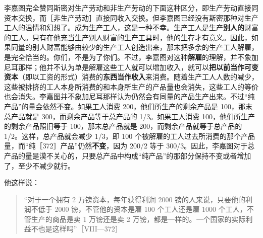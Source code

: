 李嘉图完全赞同斯密对生产劳动和非生产劳动的下面这种区分，即生产劳动直接同资本交换，而［非生产劳动］直接同收入交换。但李嘉图已经没有斯密那种对生产工人的温情和幻想了。成为生产工人，这是一种不幸。生产工人是生产\textbf{别人的}财富的工人。只有在他充当生产别人财富的生产工具时，他的生存才有意义。因此，如果同量的别人财富能够由较少的生产工人创造出来，那末把多余的生产工人解雇，是完全恰当的。你们，不是为了你们。不过，李嘉图对这种\textbf{解雇}的理解，并不象加尼耳那样；他并不认为单是解雇这些工人就可以增加收入，就可以\textbf{把以前当作可变资本}（即以工资的形式）消费的\textbf{东西当作收入}来消费。随着生产工人人数的减少，这些被排挤的工人本身所消费的和本身所生产的产品量也会消失，这些工人的等价也会消失。李嘉图并不象加尼耳那样认为仍然会有同量的产品生产出来。不过“纯产品”的量会依然不变。如果工人消费 200，他们所生产的剩余产品是 100，那末总产品就是 300，而剩余产品等于总产品的 1/3。如果工人消费 100，他们所生产的剩余产品照旧等于 100，那末总产品就是 200，而剩余产品就等于总产品的 1/2。这样，总产品就会减少 1/3，即 100 个被解雇的工人过去所消费的那个产品量，而“纯［372］产品”仍然\textbf{不变}，因为 200/2 等于 300/3。因此，李嘉图对于总产品的量是漠不关心的，只要总产品中构成“纯产品”的那部分保持不变或者增加了，至少不减少就行。

他这样说：

\begin{quote}“对于一个拥有 2 万镑资本，每年获得利润 2000 镑的人来说，只要他的利润不低于 2000 镑，不管他的资本是雇 100 个工人还是雇 1000 个工人，不管生产的商品是卖 1 万镑还是卖 2 万镑，都是一样的。一个国家的实际利益不也是这样吗”［VIII—372］\end{quote}

